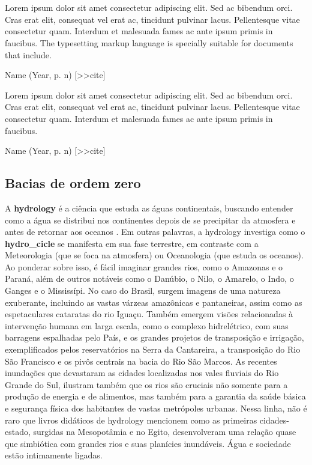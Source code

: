 \documentclass[./main.tex]{subfiles}
\begin{document}
\chapter{\chapHydro} \label{chap:hydrology}

\setlength{\parskip}{0mm}

\epigraph{\small{Lorem ipsum dolor sit amet consectetur adipiscing elit. Sed ac bibendum orci. Cras erat elit, consequat vel erat ac, tincidunt pulvinar lacus. Pellentesque vitae consectetur quam. Interdum et malesuada fames ac ante ipsum primis in faucibus. The typesetting markup language is specially suitable for documents that include.}}{Name (Year, p. n) [>>cite]}

\epigraph{\small{Lorem ipsum dolor sit amet consectetur adipiscing elit. Sed ac bibendum orci. Cras erat elit, consequat vel erat ac, tincidunt pulvinar lacus. Pellentesque vitae consectetur quam. Interdum et malesuada fames ac ante ipsum primis in faucibus.}}{Name (Year, p. n) [>>cite]}

\setlength{\parskip}{\myparskip}

\section{Bacias de ordem zero} \label{sec:hydro:intro}

\par A \textbf{\gls{hydrology}} é a ciência que estuda as águas continentais, buscando entender como a água se distribui nos continentes depois de se precipitar da atmosfera e antes de retornar aos oceanos \cite{chow1964}. Em outras palavras, a \gls{hydrology} investiga como o \textbf{\gls{hydro_cicle}} se manifesta em sua fase terrestre, em contraste com a Meteorologia (que se foca na atmosfera) ou Oceanologia (que estuda os oceanos). Ao ponderar sobre isso, é fácil imaginar grandes rios, como o Amazonas e o Paraná, além de outros notáveis como o Danúbio, o Nilo, o Amarelo, o Indo, o Ganges e o Mississípi. No caso do Brasil, surgem imagens de uma natureza exuberante, incluindo as vastas várzeas amazônicas e pantaneiras, assim como as espetaculares cataratas do rio Iguaçu. Também emergem visões relacionadas à intervenção humana em larga escala, como o complexo hidrelétrico, com suas barragens espalhadas pelo País, e os grandes projetos de transposição e irrigação, exemplificados pelos reservatórios na Serra da Cantareira, a transposição do Rio São Francisco e os pivôs centrais na bacia do Rio São Marcos. As recentes inundações que devastaram as cidades localizadas nos vales fluviais do Rio Grande do Sul, ilustram também que os rios são cruciais não somente para a produção de energia e de alimentos, mas também para a garantia da saúde básica e segurança física dos habitantes de vastas metrópoles urbanas. Nessa linha, não é raro que livros didáticos de \gls{hydrology} mencionem como as primeiras cidades-estado, surgidas na Mesopotâmia e no Egito, desenvolveram uma relação quase que simbiótica com grandes rios e suas planícies inundáveis. Água e sociedade estão intimamente ligadas. 
\end{document}
